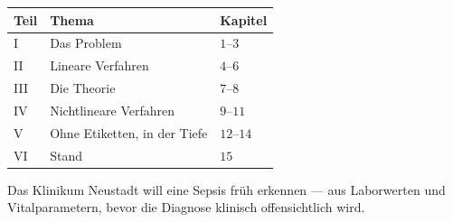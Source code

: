 \begin{merksatz}
\begin{center}
{\small
\renewcommand{\arraystretch}{1.5}
\begin{tabular}{@{}P{1.4cm}P{3.0cm}P{3.6cm}@{}}
\toprule
\textbf{Teil} & \textbf{Thema} & \textbf{Kapitel}\\
\midrule
I & Das Problem & $1$--$3$\\
II & Lineare Verfahren & $4$--$6$\\
III & Die Theorie & $7$--$8$\\
IV & Nichtlineare Verfahren & $9$--$11$\\
V & Ohne Etiketten, in der Tiefe & $12$--$14$\\
VI & Stand & $15$\\
\bottomrule
\end{tabular}}
\end{center}

Das Klinikum Neustadt will eine Sepsis früh erkennen --- aus Laborwerten und Vitalparametern, bevor die Diagnose klinisch offensichtlich wird.

\begin{center}
\begin{minipage}{0.88\textwidth}
\end{minipage}
\end{center}
\end{merksatz}

